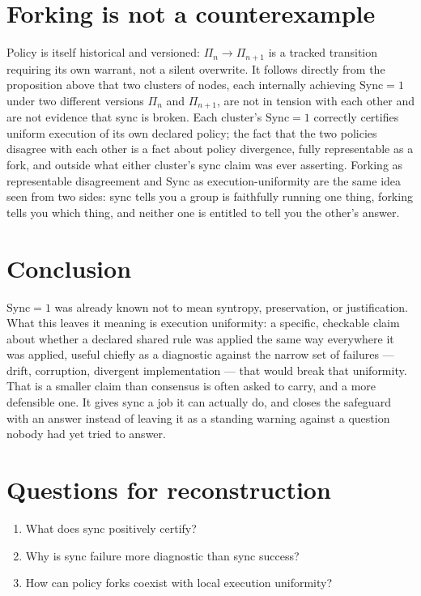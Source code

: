 \documentclass[11pt,openany]{book}
\begin{document}
\section{Forking is not a counterexample}

Policy is itself historical and versioned: $\Pi_n \to \Pi_{n+1}$ is a tracked transition requiring its own warrant, not a silent overwrite. It follows directly from the proposition above that two clusters of nodes, each internally achieving $\mathrm{Sync}=1$ under two different versions $\Pi_n$ and $\Pi_{n+1}$, are not in tension with each other and are not evidence that sync is broken. Each cluster's $\mathrm{Sync}=1$ correctly certifies uniform execution of its own declared policy; the fact that the two policies disagree with each other is a fact about policy divergence, fully representable as a fork, and outside what either cluster's sync claim was ever asserting. Forking as representable disagreement and $\mathrm{Sync}$ as execution-uniformity are the same idea seen from two sides: sync tells you a group is faithfully running one thing, forking tells you which thing, and neither one is entitled to tell you the other's answer.

\section{Conclusion}

$\mathrm{Sync}=1$ was already known not to mean syntropy, preservation, or justification. What this leaves it meaning is execution uniformity: a specific, checkable claim about whether a declared shared rule was applied the same way everywhere it was applied, useful chiefly as a diagnostic against the narrow set of failures — drift, corruption, divergent implementation — that would break that uniformity. That is a smaller claim than consensus is often asked to carry, and a more defensible one. It gives sync a job it can actually do, and closes the safeguard with an answer instead of leaving it as a standing warning against a question nobody had yet tried to answer.

\section*{Questions for reconstruction}

\begin{enumerate}

\item What does sync positively certify?

\item Why is sync failure more diagnostic than sync success?

\item How can policy forks coexist with local execution uniformity?

\end{enumerate}
\end{document}
